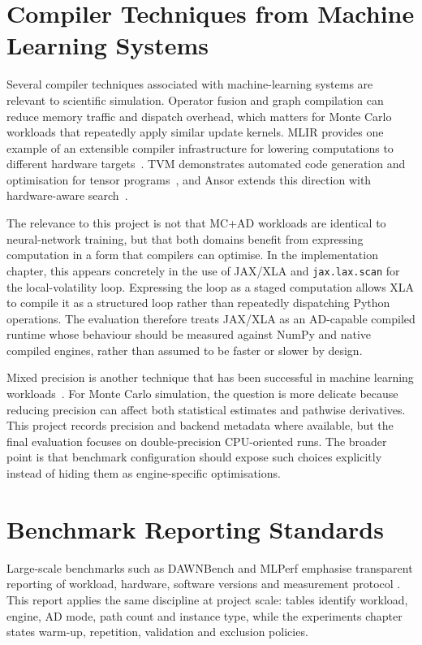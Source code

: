 \section{Compiler Techniques from Machine Learning Systems}

Several compiler techniques associated with machine-learning systems are
relevant to scientific simulation. Operator fusion and graph compilation can
reduce memory traffic and dispatch overhead, which matters for Monte Carlo
workloads that repeatedly apply similar update kernels. MLIR provides one
example of an extensible compiler infrastructure for lowering computations to
different hardware targets~\cite{lattner2020mlir}. TVM demonstrates automated
code generation and optimisation for tensor programs~\cite{chen2018tvm}, and
Ansor extends this direction with hardware-aware search~\cite{zheng2020ansor}.

The relevance to this project is not that MC+AD workloads are identical to
neural-network training, but that both domains benefit from expressing
computation in a form that compilers can optimise. In the implementation
chapter, this appears concretely in the use of JAX/XLA and \texttt{jax.lax.scan}
for the local-volatility loop. Expressing the loop as a staged computation
allows XLA to compile it as a structured loop rather than repeatedly dispatching
Python operations. The evaluation therefore treats JAX/XLA as an AD-capable
compiled runtime whose behaviour should be measured against NumPy and native
compiled engines, rather than assumed to be faster or slower by design.

Mixed precision is another technique that has been successful in machine
learning workloads~\cite{micikevicius2017mixed}. For Monte Carlo simulation,
the question is more delicate because reducing precision can affect both
statistical estimates and pathwise derivatives. This project records precision
and backend metadata where available, but the final evaluation focuses on
double-precision CPU-oriented runs. The broader point is that benchmark
configuration should expose such choices explicitly instead of hiding them as
engine-specific optimisations.

\section{Benchmark Reporting Standards}

Large-scale benchmarks such as DAWNBench and MLPerf emphasise transparent
reporting of workload, hardware, software versions and measurement protocol
\cite{coleman2017dawnbench,coleman2019dawnbench,mattson2020mlperf}. This
report applies the same discipline at project scale: tables identify workload,
engine, AD mode, path count and instance type, while the experiments chapter
states warm-up, repetition, validation and exclusion policies.

